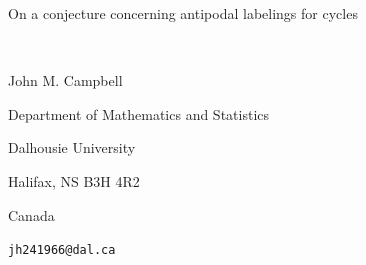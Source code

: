 \documentclass[12pt]{article}
\begin{document}
\begin{center}
 {\large  On a conjecture concerning antipodal labelings for cycles}



 \ 

{\sc John M. Campbell}

\vspace{0.1in}

{\footnotesize Department of Mathematics and Statistics}

{\footnotesize Dalhousie University}

{\footnotesize Halifax, NS B3H 4R2}

{\footnotesize Canada}

\vspace{0.1in}

{\footnotesize {\tt jh241966@dal.ca}}

\vspace{0.1in}


\end{center}


\begin{abstract}
 Let $G$ denote a finite, connected, simple graph, and let $D$ denote its diameter, and let $d_{G}(u, v)$ denote the distance between 
 vertices $u$ and $v$ in $V(G)$. An \emph{antipodal labeling} of $G$ is a mapping $f\colon V(G) \to \mathbb{N}_{0}$ such that, for each 
 pair $(u, v)$ consisting of distinct vertices in $V(G)$, the relation $ |f(u) - f(v)| \geq D - d_{G}(u, v) $ holds. The \emph{span} of $f$ is then 
 defined so that $\operatorname{sp}(f) = \max\{ f(u) - f(v) : u, v \in V(G) \}$. The \emph{antipodal number} of $G$, denoted with 
 $\operatorname{an}(G)$, may then be defined as the minimum possible span among all antipodal labelings of $G$. Juan and Liu 
 [\emph{Ars Combin.}, 2012] proved the upper bound $\operatorname{an}(C_{4k}) \leq 2k^2 - 1$, and conjectured that 
 $\operatorname{an}(C_{4k}) = 2k^2 - 1$ for each positive integer $k$, and Juan and Liu verified this conjecture for $k \leq 5$. We 
 succeed in proving Juan and Liu's conjecture, which seems to have remained open. The openness of Juan and Liu's conjecture has been 
 noted, over the years, by many authors, including Rao et al.\ [\emph{Contrib. Discrete Math.}, 2015] and Saha et al.\ [\emph{Theory 
 Comput. Syst.}, 2022]. 
\end{abstract}


\vspace{0.1in}

\end{document}
